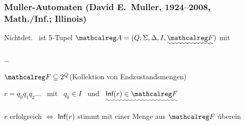     \begin{frame}[t]
      \frametitle{Muller-Automaten \hfill {\footnotesize (David E.\ Muller, 1924--2008, Math./Inf.; Illinois)}}

      \begin{Definition}{}
        Nichtdet.\  ist 5-$\!$Tupel $\Aut{A} = (Q, \Sigma, \Delta, I, \Uwave{\calF})$ mit
        \begin{Itemize}
          \item
            \dots
          \item
            $\calF \subseteq 2^Q$\quad (Kollektion von Endzustandsmengen)
        \end{Itemize}
        \par\medskip
         $r = q_0q_1q_2\dots$ ~mit~
        $q_0 \in I$ ~und~ $\UWave{\Inf(r) \in \calF}$
      \end{Definition}

      \par\bigskip
       $r$ erfolgreich $\Leftrightarrow$ $\textsf{Inf}(r)$ stimmt mit einer Menge aus $\calF$ überein

      \par\bigskip
      \Tafel

    \end{frame}


